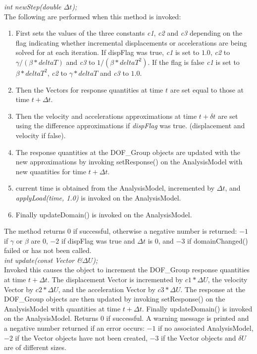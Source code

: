 {\em int newStep(double $\Delta t$);}\\
The following are performed when this method is invoked:
\begin{enumerate}
\item First sets the values of the three constants {\em c1}, {\em c2}
and {\em c3} depending on the flag indicating whether incremental
displacements or accelerations are being solved for at each iteration.
If \p dispFlag was \p true, {\em c1} is set to $1.0$, {\em c2} to $
\gamma / (\beta * deltaT)$ and {\em c3} to $1/ (\beta * deltaT^2)$. If
the flag is \p false {\em c1} is set to $\beta * deltaT^2$, {\em c2} to $
\gamma * deltaT$ and {\em c3} to $1.0$. 
\item Then the Vectors for response quantities at time $t$ are set
equal to those at time $t + \Delta t$.
\item Then the velocity and accelerations approximations at time $t +
\delta t$ are set using the difference approximations if {\em
dispFlag} was \p true. (displacement and velocity if \p false).
\item The response quantities at the DOF\_Group objects are updated
with the new approximations by invoking setResponse() on the
AnalysisModel with new quantities for time $t + \Delta t$.
\item current time is obtained from the AnalysisModel, incremented by
$\Delta t$, and {\em applyLoad(time, 1.0)} is invoked on the
AnalysisModel. 
\item Finally updateDomain() is invoked on the AnalysisModel.
\end{enumerate}
The method returns $0$ if successful, otherwise a negative number is
returned: $-1$ if $\gamma$ or $\beta$ are $0$, $-2$ if \p dispFlag
was true and $\Delta t$ is $0$, and $-3$ if domainChanged()
failed or has not been called. \\

{\em int update(const Vector \&$\Delta U$);} \\
Invoked this causes the object to increment the DOF\_Group
response quantities at time $t + \Delta t$. The displacement Vector is  
incremented by $ c1 * \Delta U$, the velocity Vector by $
c2 * \Delta U$, and the acceleration Vector by $c3 * \Delta U$. 
The response at the DOF\_Group objects are then updated by invoking
setResponse() on the AnalysisModel with quantities at time $t +
\Delta t$. Finally updateDomain() is invoked on the
AnalysisModel. Returns
$0$ if successful. A warning message is printed and a negative number
returned if an error occurs: $-1$ if no associated AnalysisModel, $-2$
if the Vector objects have not been created, $-3$ if the Vector
objects and $\delta U$ are of different sizes. \\


